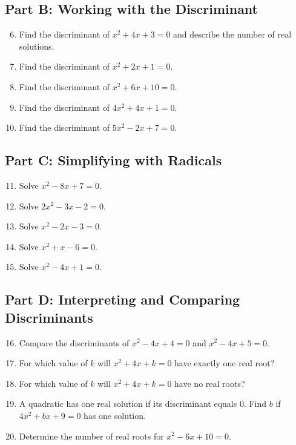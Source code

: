 \documentclass[12pt]{article}
\begin{document}
\subsection*{Part B: Working with the Discriminant}
\begin{enumerate}
  \setcounter{enumi}{5}
  \item Find the discriminant of \(x^2 + 4x + 3 = 0\) and describe the number of real solutions.
  \item Find the discriminant of \(x^2 + 2x + 1 = 0.\)
  \item Find the discriminant of \(x^2 + 6x + 10 = 0.\)
  \item Find the discriminant of \(4x^2 + 4x + 1 = 0.\)
  \item Find the discriminant of \(5x^2 - 2x + 7 = 0.\)
\end{enumerate}

\subsection*{Part C: Simplifying with Radicals}
\begin{enumerate}
  \setcounter{enumi}{10}
  \item Solve \(x^2 - 8x + 7 = 0.\)
  \item Solve \(2x^2 - 3x - 2 = 0.\)
  \item Solve \(x^2 - 2x - 3 = 0.\)
  \item Solve \(x^2 + x - 6 = 0.\)
  \item Solve \(x^2 - 4x + 1 = 0.\)
\end{enumerate}

\subsection*{Part D: Interpreting and Comparing Discriminants}
\begin{enumerate}
  \setcounter{enumi}{15}
  \item Compare the discriminants of \(x^2 - 4x + 4 = 0\) and \(x^2 - 4x + 5 = 0.\)
  \item For which value of \(k\) will \(x^2 + 4x + k = 0\) have exactly one real root?
  \item For which value of \(k\) will \(x^2 + 4x + k = 0\) have no real roots?
  \item A quadratic has one real solution if its discriminant equals 0. Find \(b\) if \(4x^2 + bx + 9 = 0\) has one solution.
  \item Determine the number of real roots for \(x^2 - 6x + 10 = 0.\)
\end{enumerate}
\end{document}
